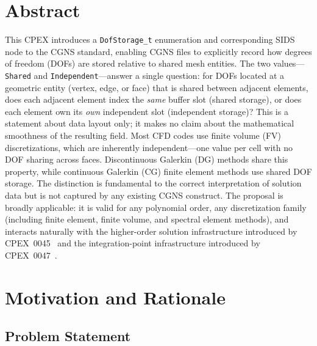 \documentclass[11pt,letterpaper]{article}
\begin{document}
\vspace{1.5em}

\tableofcontents
\newpage

\section{Abstract}

This CPEX introduces a \texttt{DofStorage\_t} enumeration and corresponding
SIDS node to the CGNS standard, enabling CGNS files to explicitly record how degrees of
freedom (DOFs) are stored relative to shared mesh entities.  The two values---\texttt{Shared}
and \texttt{Independent}---answer a single question: for DOFs located at a geometric entity
(vertex, edge, or face) that is shared between adjacent elements, does each adjacent element
index the \emph{same} buffer slot (shared storage), or does each element own its
\emph{own} independent slot (independent storage)?  This is a statement about data layout
only; it makes no claim about the mathematical smoothness of the resulting field.
Most CFD codes use finite volume (FV) discretizations, which are inherently independent---one
value per cell with no DOF sharing across faces.  Discontinuous Galerkin (DG) methods share
this property, while continuous Galerkin (CG) finite element methods use shared DOF storage.
The distinction is fundamental to the correct interpretation of solution data but is not
captured by any existing CGNS construct.  The proposal is broadly applicable: it is valid for
any polynomial order, any discretization family (including finite element, finite volume,
and spectral element methods), and interacts naturally with the higher-order solution
infrastructure introduced by CPEX~0045~\cite{cpex0045} and the integration-point
infrastructure introduced by CPEX~0047~\cite{cpex0047}.


\section{Motivation and Rationale}

\subsection{Problem Statement}
\end{document}
